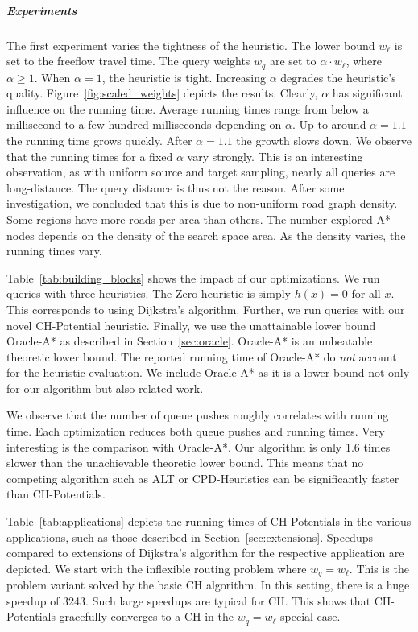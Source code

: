 \documentclass[letterpaper]{article} %
\begin{document}
\subparagraph{Experiments}
The first experiment varies the tightness of the heuristic.
The lower bound $w_\ell$ is set to the freeflow travel time.
The query weights $w_q$ are set to $\alpha \cdot w_\ell$, where $\alpha\ge 1$.
When $\alpha = 1$, the heuristic is tight.
Increasing $\alpha$ degrades the heuristic's quality.
Figure~\ref{fig:scaled_weights} depicts the results.
Clearly, $\alpha$ has significant influence on the running time.
Average running times range from below a millisecond to a few hundred milliseconds depending on $\alpha$.
Up to around $\alpha = 1.1$ the running time grows quickly.
After $\alpha = 1.1$ the growth slows down.
We observe that the running times for a fixed $\alpha$ vary strongly.
This is an interesting observation, as with uniform source and target sampling, nearly all queries are long-distance.
The query distance is thus not the reason.
After some investigation, we concluded that this is due to non-uniform road graph density.
Some regions have more roads per area than others.
The number explored A* nodes depends on the density of the search space area.
As the density varies, the running times vary.

Table~\ref{tab:building_blocks} shows the impact of our optimizations.
We run queries with three heuristics.
The Zero heuristic is simply $h(x)=0$ for all $x$.
This corresponds to using Dijkstra's algorithm.
Further, we run queries with our novel CH-Potential heuristic.
Finally, we use the unattainable lower bound Oracle-A* as described in Section~\ref{sec:oracle}.
Oracle-A* is an unbeatable theoretic lower bound.
The reported running time of Oracle-A* do \emph{not} account for the heuristic evaluation.
We include Oracle-A* as it is a lower bound not only for our algorithm but also related work.

We observe that the number of queue pushes roughly correlates with running time.
Each optimization reduces both queue pushes and running times.
Very interesting is the comparison with Oracle-A*.
Our algorithm is only 1.6 times slower than the unachievable theoretic lower bound.
This means that no competing algorithm such as ALT or CPD-Heuristics can be significantly faster than CH-Potentials.

Table~\ref{tab:applications} depicts the running times of CH-Potentials in the various applications, such as those described in Section~\ref{sec:extensions}.
Speedups compared to extensions of Dijkstra's algorithm for the respective application are depicted.
We start with the inflexible routing problem where $w_q = w_\ell$.
This is the problem variant solved by the basic CH algorithm.
In this setting, there is a huge speedup of 3243.
Such large speedups are typical for CH.
This shows that CH-Potentials gracefully converges to a CH in the $w_q = w_\ell$ special case.
\end{document}
